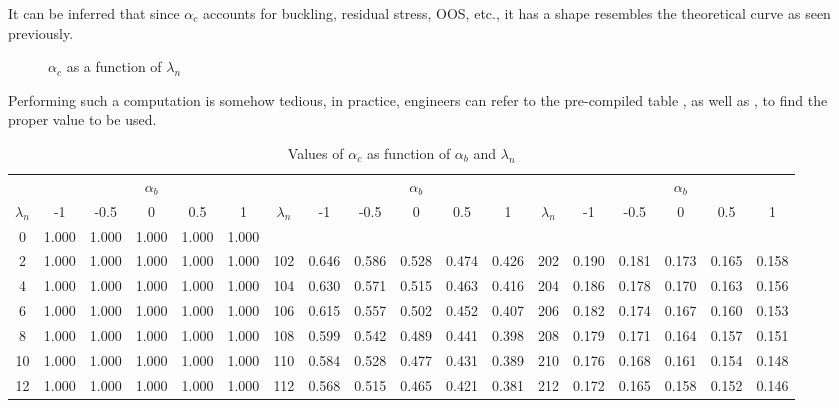 It can be inferred that since $\alpha_c$ accounts for buckling, residual stress, OOS, etc., it has a shape resembles the theoretical curve as seen previously.
\begin{figure}[H]
\centering

\caption{$\alpha_c$ as a function of $\lambda_n$}\label{fig:alpha_c}
\end{figure}

Performing such a computation is somehow tedious, in practice, engineers can refer to the pre-compiled table , as well as , to find the proper value to be used.
\begin{table}[H]
\centering\scriptsize\setlength{\tabcolsep}{4pt}\renewcommand{\arraystretch}{1.03}
\caption{Values of $\alpha_c$ as function of $\alpha_b$ and $\lambda_n$}\label{tab:alpha_c}
\begin{tabular}{c|ccccc|c|ccccc|c|ccccc}
	\toprule
	            &    \multicolumn{5}{c|}{$\alpha_b$}    &             &    \multicolumn{5}{c|}{$\alpha_b$}    &             &    \multicolumn{5}{c}{$\alpha_b$}     \\
	$\lambda_n$ &  -1   & -0.5  &   0   &  0.5  &   1   & $\lambda_n$ &  -1   & -0.5  &   0   &  0.5  &   1   & $\lambda_n$ &  -1   & -0.5  &   0   &  0.5  &   1   \\ \midrule
	     0      & 1.000 & 1.000 & 1.000 & 1.000 & 1.000 &             &       &       &       &       &       &             &       &       &       &       &       \\
	     2      & 1.000 & 1.000 & 1.000 & 1.000 & 1.000 &     102     & 0.646 & 0.586 & 0.528 & 0.474 & 0.426 &     202     & 0.190 & 0.181 & 0.173 & 0.165 & 0.158 \\
	     4      & 1.000 & 1.000 & 1.000 & 1.000 & 1.000 &     104     & 0.630 & 0.571 & 0.515 & 0.463 & 0.416 &     204     & 0.186 & 0.178 & 0.170 & 0.163 & 0.156 \\
	     6      & 1.000 & 1.000 & 1.000 & 1.000 & 1.000 &     106     & 0.615 & 0.557 & 0.502 & 0.452 & 0.407 &     206     & 0.182 & 0.174 & 0.167 & 0.160 & 0.153 \\
	     8      & 1.000 & 1.000 & 1.000 & 1.000 & 1.000 &     108     & 0.599 & 0.542 & 0.489 & 0.441 & 0.398 &     208     & 0.179 & 0.171 & 0.164 & 0.157 & 0.151 \\
	    10      & 1.000 & 1.000 & 1.000 & 1.000 & 1.000 &     110     & 0.584 & 0.528 & 0.477 & 0.431 & 0.389 &     210     & 0.176 & 0.168 & 0.161 & 0.154 & 0.148 \\
	    12      & 1.000 & 1.000 & 1.000 & 1.000 & 1.000 &     112     & 0.568 & 0.515 & 0.465 & 0.421 & 0.381 &     212     & 0.172 & 0.165 & 0.158 & 0.152 & 0.146 \\

\end{tabular}
\end{table}
